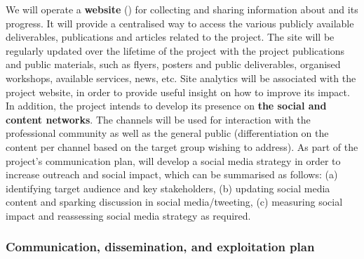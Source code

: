 We will operate a \textbf{website}
() for collecting and sharing information about \TheProject and its progress.
It will provide a centralised way to access the various publicly available deliverables, publications
and articles related to the project. The site will be regularly updated over the lifetime of the project
with the project publications and public materials, such as flyers, posters and
public deliverables, organised workshops, available services, news, etc.
Site analytics will be associated with the project website, in order
to provide useful insight on how to improve its impact. In addition, the project intends to
develop its presence on \textbf{the social and content
networks}. The channels will be used for interaction
with the professional community as well as the general public
(differentiation on the content per channel based on the target group wishing to address).
As part of the project's communication plan, \TheProject will develop a social media strategy
in order to increase outreach and social impact, which can be summarised as follows: (a) identifying target
audience and key stakeholders, (b) updating social media content and sparking
discussion in social media/tweeting, (c) measuring social impact and reassessing
social media strategy as required.

\subsubsection{Communication, dissemination, and exploitation plan}

